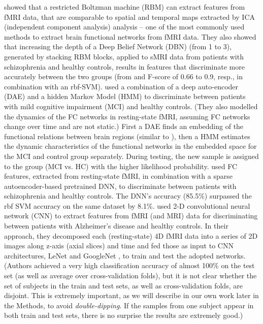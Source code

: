 \documentclass{article}
\begin{document}
\citet{Plis2014} showed that a restricted Boltzman machine (RBM) \citep{Hinton2002} can extract features from fMRI data, that are comparable to spatial and temporal maps extracted by ICA (independent component analysis) analysis – one of the most commonly used methods to extract brain functional networks from fMRI data. They also showed that increasing the depth of a Deep Belief Network (DBN) \citep{Hinton2006} (from 1 to 3), generated by stacking RBM blocks, applied to sMRI data from patients with schizophrenia and healthy controls, results in features that discriminate more accurately between the two groups (from and F-score of 0.66 to 0.9, resp., in combination with an rbf-SVM). \citet{Suk2016} used a combination of a deep auto-encoder (DAE) and a hidden Markov Model (HMM) to discriminate between patients with mild cognitive impairment (MCI) and healthy controls. (They also modelled the dynamics of the FC networks in resting-state fMRI, assuming FC networks change over time and are not static.) First a DAE finds an embedding of the functional relations between brain regions (similar to \citep{Plis2014}), then a HMM estimates the dynamic characteristics of the functional networks in the embedded space for the MCI and control group separately. During testing, the new sample is assigned to the group (MCI vs. HC) with the higher likelihood probability. \citet{Kim2016} used FC features, extracted from resting-state fMRI, in combination with a sparse autoencoder-based pretrained DNN, to discriminate between patients with schizophrenia and healthy controls. The DNN's accuracy (85.5\%) surpassed the rbf SVM accuracy on the same dataset by 8.1\%. \citet{Sarraf2016} used 2-D convolutional neural network (CNN) to extract features from fMRI (and MRI) data for discriminating between patients with Alzheimer’s disease and healthy controls. In their approach, they decomposed each (resting-state) 4D fMRI data into a series of 2D images along z-axis (axial slices) and time and fed those as input to CNN architectures, LeNet \citep{Lecun1998} and GoogleNet \citep{Szegedy2015}, to train and test the adopted networks. (Authors achieved a very high classification accuracy of almost 100\% on the test set (as well as average over cross-validation folds), but it is not clear whether the set of subjects in the train and test sets, as well as cross-validation folds, are disjoint. This is extremely important, as we will describe in our own work later in the Methods, to avoid \textit{double-dipping}. If the samples from one subject appear in both train and test sets, there is no surprise the results are extremely good.)
\end{document}
